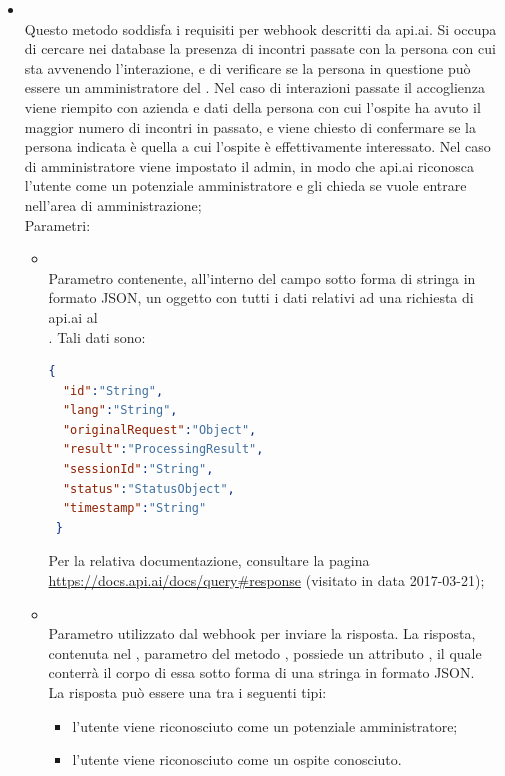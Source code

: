 \begin{itemize}
\begin{itemize}
		\item[]  \\		Questo metodo soddisfa i requisiti per webhook descritti da api.ai. Si occupa di cercare nei database la presenza di incontri passate con la persona con cui sta avvenendo l'interazione, e di verificare se la persona in questione può essere un amministratore del . Nel caso di interazioni passate il  accoglienza viene riempito con azienda e dati della persona con cui l'ospite ha avuto il maggior numero di incontri in passato, e viene chiesto di confermare se la persona indicata è quella a cui l'ospite è effettivamente interessato. Nel caso di amministratore viene impostato il  admin, in modo che api.ai riconosca l'utente come un potenziale amministratore e gli chieda se vuole entrare nell'area di amministrazione;\\
		Parametri:
		\begin{itemize}
			\item {} \\
			Parametro contenente, all'interno del campo  sotto forma di stringa in formato JSON, un oggetto con tutti i dati relativi ad una richiesta di api.ai al \\ . Tali dati sono:
\begin{lstlisting}[language=json,firstnumber=1]
{
  "id":"String",
  "lang":"String",
  "originalRequest":"Object",
  "result":"ProcessingResult",
  "sessionId":"String",
  "status":"StatusObject",
  "timestamp":"String"
 }
\end{lstlisting}
Per la relativa documentazione, consultare la pagina \url{https://docs.api.ai/docs/query#response} (visitato in data 2017-03-21);
			\item {} \\
			Parametro utilizzato dal webhook per inviare la risposta. La risposta, contenuta nel , parametro del metodo , possiede un attributo , il quale conterrà il corpo di essa sotto forma di una stringa in formato JSON. \\
La risposta può essere una tra i seguenti tipi:
\begin{itemize}
    \item l'utente viene riconosciuto come un potenziale amministratore;
    \item l'utente viene riconosciuto come un ospite conosciuto.

\end{itemize}
\end{itemize}
\end{itemize}
\end{itemize}
